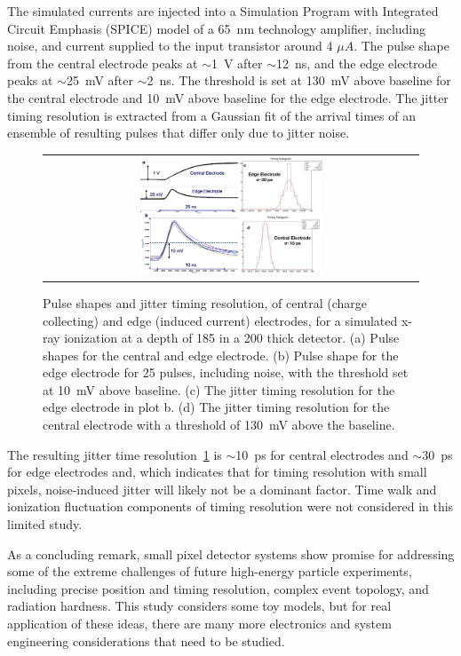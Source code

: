 The simulated currents are injected into a Simulation Program with Integrated Circuit Emphasis (SPICE) model of a \SI{65}{\nm} technology amplifier, including noise, and current supplied to the input transistor around 4 $\mu A$.
The pulse shape from the central electrode peaks at $\sim$\SI{1}{\V} after $\sim$\SI{12}{\ns}, and the edge electrode peaks at $\sim$\SI{25}{\mV} after $\sim$\SI{2}{\ns}.
The threshold is set at \SI{130}{\mV} above baseline for the central electrode and \SI{10}{\mV} above baseline for the edge electrode.
The jitter timing resolution is extracted from a Gaussian fit of the arrival times of an ensemble of resulting pulses that differ only due to jitter noise.
\begin{figure}[h]
  \begin{center}
    \begin{tabular}{c}
      \includegraphics[width=0.5\textwidth]{fig_FastTiming/TimingResolutions.png}
    \end{tabular}
    \caption{Pulse shapes and jitter timing resolution, of central (charge collecting) and edge (induced current) electrodes, for a simulated x-ray ionization at a depth of \SI{185}{\micron} in a \SI{200}{\micron} thick detector.
        (a) Pulse shapes for the central and edge electrode. 
        (b) Pulse shape for the edge electrode for 25 pulses, including noise, with the threshold set at \SI{10}{\mV} above baseline.
        (c) The jitter timing resolution for the edge electrode in plot b.
        (d) The jitter timing resolution for the central electrode with a threshold of \SI{130}{\mV} above the baseline.
            }
    \label{TimingResolutions}
  \end{center}
\end{figure}

The resulting jitter time resolution~\ref{TimingResolutions} is $\sim$\SI{10}{\ps} for central electrodes and $\sim$\SI{30}{\ps} for edge electrodes and, which indicates that for timing resolution with small pixels, noise-induced jitter will likely not be a dominant factor.
Time walk and ionization fluctuation components of timing resolution were not considered in this limited study.

As a concluding remark, small pixel detector systems show promise for addressing some of the extreme challenges of future high-energy particle experiments, including precise position and timing resolution, complex event topology, and radiation hardness.
This study considers some toy models, but for real application of these ideas, there are many more electronics and system engineering considerations that need to be studied.